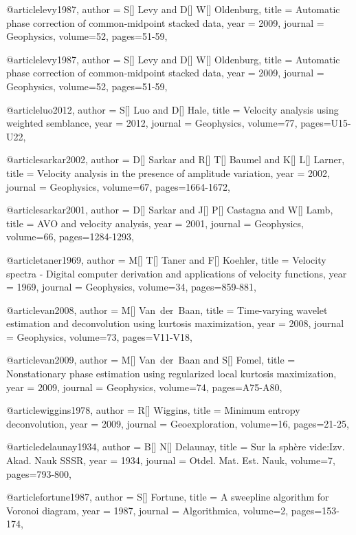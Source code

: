 @article{levy1987,
  author =	 {S[] Levy and D[] W[] Oldenburg},
  title =	 {Automatic phase correction of common-midpoint stacked data},
  year =	 2009,
  journal =	 {Geophysics},
  volume={52},
 pages=51-59,
}

@article{levy1987,
  author =	 {S[] Levy and D[] W[] Oldenburg},
  title =	 {Automatic phase correction of common-midpoint stacked data},
  year =	 2009,
  journal =	 {Geophysics},
  volume={52},
 pages=51-59,
}

@article{luo2012,
  author =	 {S[] Luo and D[] Hale},
  title =	 {Velocity analysis using weighted semblance},
  year =	 2012,
  journal =	 {Geophysics},
  volume={77},
 pages=U15-U22,
}

@article{sarkar2002,
  author =	 {D[] Sarkar and R[] T[] Baumel and K[] L[] Larner},
  title =	 {Velocity analysis in the presence of amplitude variation},
  year =	 2002,
  journal =	 {Geophysics},
  volume={67},
  pages=1664-1672,
}

@article{sarkar2001,
  author =	 {D[] Sarkar and J[] P[] Castagna and W[] Lamb},
  title =	 {AVO and velocity analysis},
  year =	 2001,
  journal =	 {Geophysics},
  volume={66},
 pages=1284-1293,
}

@article{taner1969,
  author =	 {M[] T[] Taner and F[] Koehler},
  title =	 {Velocity spectra - Digital computer derivation and applications of velocity functions},
  year =	 1969,
  journal =	 {Geophysics},
  volume={34},
 pages=859-881,
}

@article{van2008,
  author =	 {M[] Van~der~Baan},
  title =	 {Time-varying wavelet estimation and deconvolution using kurtosis maximization},
  year =	 2008,
  journal =	 {Geophysics},
  volume={73},
 pages=V11-V18,
}

@article{van2009,
  author =	 {M[] Van~der~Baan and S[] Fomel},
  title =	 {Nonstationary phase estimation using regularized local kurtosis maximization},
  year =	 2009,
  journal =	 {Geophysics},
  volume={74},
 pages=A75-A80,
}

@article{wiggins1978,
  author =	 {R[] Wiggins},
  title =	 {Minimum entropy deconvolution},
  year =	 2009,
  journal =	 {Geoexploration},
  volume={16},
 pages=21-25,
}

@article{delaunay1934,
  author =	 {B[] N[] Delaunay},
  title =	 {Sur la sph\`{e}re vide:Izv. Akad. Nauk SSSR},
  year =	 1934,
  journal =	 {Otdel. Mat. Est. Nauk},
  volume={7},
 pages=793-800,
}

@article{fortune1987,
  author =	 {S[] Fortune},
  title =	 {A sweepline algorithm for Voronoi diagram},
  year =	 1987,
  journal =	 {Algorithmica},
  volume={2},
 pages=153-174,
}

